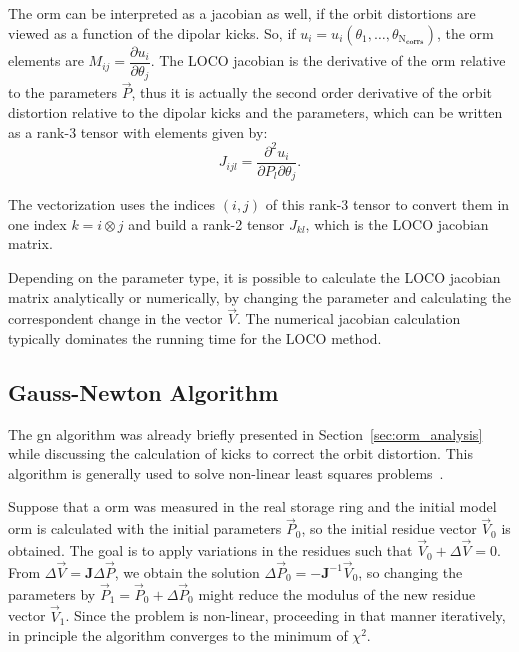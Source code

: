 The \gls{orm} can be interpreted as a jacobian as well, if the orbit distortions are viewed as a function of the dipolar kicks. So, if $u_i = u_i\left(\theta_1, \ldots, \theta_{\mathrm{N}_{\mathbf{corrs}}}\right)$, the \gls{orm} elements are $M_{ij} = \dfrac{\partial u_i}{\partial \theta_j}$. The LOCO jacobian is the derivative of the \gls{orm} relative to the parameters $\vec{P}$, thus it is actually the second order derivative of the orbit distortion relative to the dipolar kicks and the parameters, which can be written as a rank-3 tensor with elements given by:
\begin{equation}
    J_{ijl} = \dfrac{\partial^2 u_i}{\partial P_{l}\partial \theta_j}.
\end{equation}

The vectorization uses the indices $(i, j)$ of this rank-3 tensor to convert them in one index $k = i \otimes j$ and build a rank-2 tensor $J_{kl}$, which is the LOCO jacobian matrix.

Depending on the parameter type, it is possible to calculate the LOCO jacobian matrix analytically or numerically, by changing the parameter and calculating the correspondent change in the vector $\vec{V}$. The numerical jacobian calculation typically dominates the running time for the LOCO method.
\subsection{Gauss-Newton Algorithm}
The \gls{gn} algorithm was already briefly presented in Section~\ref{sec:orm_analysis} while discussing the calculation of kicks to correct the orbit distortion. This algorithm is generally used to solve non-linear least squares problems~\cite{numerical_recipes}. 

Suppose that a \gls{orm} was measured in the real storage ring and the initial model \gls{orm} is calculated with the initial parameters $\vec{P}_0$, so the initial residue vector $\vec{V}_0$ is obtained. The goal is to apply variations in the residues such that $\vec{V}_0 + \Delta \vec{V} = 0$. From $\Delta \vec{V} = \mathbf{J}\Delta \vec{P}$, we obtain the solution $\Delta \vec{P}_0 = -\mathbf{J}^{-1} \vec{V}_0$, so changing the parameters by $\vec{P}_1 = \vec{P}_0 + \Delta \vec{P}_0$ might reduce the modulus of the new residue vector $\vec{V}_1$. Since the problem is non-linear, proceeding in that manner iteratively, in principle the algorithm converges to the minimum of $\chi^2$.


